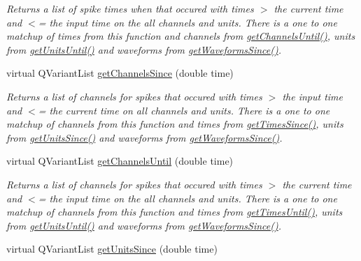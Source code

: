 \begin{DoxyCompactItemize}
\begin{DoxyCompactList}\small\item\em Returns a list of spike times when that occured with times $>$ the current time and $<$= the input time on the all channels and units. There is a one to one matchup of times from this function and channels from \hyperlink{class_picto_1_1_spike_state_aaab7883be0f0a4f035a9b0c7eb567da1}{get\-Channels\-Until()}, units from \hyperlink{class_picto_1_1_spike_state_a73c82b648f2dc88b51c6b0de31b0a21a}{get\-Units\-Until()} and waveforms from \hyperlink{class_picto_1_1_spike_state_a17daf1a1128b58cc00fb0ea815fb9fe4}{get\-Waveforms\-Since()}. \end{DoxyCompactList}\item 
\hypertarget{class_picto_1_1_spike_state_a154d5d6c0a6c3b62115c4cfe9cebc024}{virtual Q\-Variant\-List \hyperlink{class_picto_1_1_spike_state_a154d5d6c0a6c3b62115c4cfe9cebc024}{get\-Channels\-Since} (double time)}\label{class_picto_1_1_spike_state_a154d5d6c0a6c3b62115c4cfe9cebc024}

\begin{DoxyCompactList}\small\item\em Returns a list of channels for spikes that occured with times $>$ the input time and $<$= the current time on all channels and units. There is a one to one matchup of channels from this function and times from \hyperlink{class_picto_1_1_spike_state_a3f5289c57f69cb73e38b55444b74853b}{get\-Times\-Since()}, units from \hyperlink{class_picto_1_1_spike_state_a8f1866573bf338a9c4cc388a38ad5ada}{get\-Units\-Since()} and waveforms from \hyperlink{class_picto_1_1_spike_state_a17daf1a1128b58cc00fb0ea815fb9fe4}{get\-Waveforms\-Since()}. \end{DoxyCompactList}\item 
\hypertarget{class_picto_1_1_spike_state_aaab7883be0f0a4f035a9b0c7eb567da1}{virtual Q\-Variant\-List \hyperlink{class_picto_1_1_spike_state_aaab7883be0f0a4f035a9b0c7eb567da1}{get\-Channels\-Until} (double time)}\label{class_picto_1_1_spike_state_aaab7883be0f0a4f035a9b0c7eb567da1}

\begin{DoxyCompactList}\small\item\em Returns a list of channels for spikes that occured with times $>$ the current time and $<$= the input time on the all channels and units. There is a one to one matchup of channels from this function and times from \hyperlink{class_picto_1_1_spike_state_ae132eb7cc369b9c174eac9dd38e00413}{get\-Times\-Until()}, units from \hyperlink{class_picto_1_1_spike_state_a73c82b648f2dc88b51c6b0de31b0a21a}{get\-Units\-Until()} and waveforms from \hyperlink{class_picto_1_1_spike_state_a17daf1a1128b58cc00fb0ea815fb9fe4}{get\-Waveforms\-Since()}. \end{DoxyCompactList}\item 
\hypertarget{class_picto_1_1_spike_state_a8f1866573bf338a9c4cc388a38ad5ada}{virtual Q\-Variant\-List \hyperlink{class_picto_1_1_spike_state_a8f1866573bf338a9c4cc388a38ad5ada}{get\-Units\-Since} (double time)}\label{class_picto_1_1_spike_state_a8f1866573bf338a9c4cc388a38ad5ada}


\end{DoxyCompactItemize}

